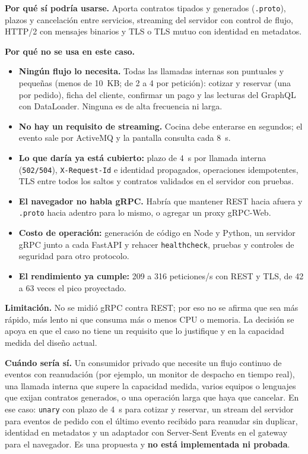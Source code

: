 \textbf{Por qué sí podría usarse.} Aporta contratos tipados y generados (\texttt{.\allowbreak{}proto}), plazos y cancelación entre servicios, streaming del servidor con control de flujo, HTTP/2 con mensajes binarios y TLS o TLS mutuo con identidad en metadatos.


\textbf{Por qué no se usa en este caso.}


\begin{itemize}[nosep,leftmargin=*]
\item \textbf{Ningún flujo lo necesita.} Todas las llamadas internas son puntuales y pequeñas (menos de 10~KB; de 2 a 4 por petición): cotizar y reservar (una por pedido), ficha del cliente, confirmar un pago y las lecturas del GraphQL con DataLoader. Ninguna es de alta frecuencia ni larga.
\item \textbf{No hay un requisito de streaming.} Cocina debe enterarse en segundos; el evento sale por ActiveMQ y la pantalla consulta cada 8~s.
\item \textbf{Lo que daría ya está cubierto:} plazo de 4~s por llamada interna (\texttt{502/\allowbreak{}504}), \texttt{X-\allowbreak{}Request-\allowbreak{}Id} e identidad propagados, operaciones idempotentes, TLS entre todos los saltos y contratos validados en el servidor con pruebas.
\item \textbf{El navegador no habla gRPC.} Habría que mantener REST hacia afuera y \texttt{.\allowbreak{}proto} hacia adentro para lo mismo, o agregar un proxy gRPC-Web.
\item \textbf{Costo de operación:} generación de código en Node y Python, un servidor gRPC junto a cada FastAPI y rehacer \texttt{healthcheck}, pruebas y controles de seguridad para otro protocolo.
\item \textbf{El rendimiento ya cumple:} 209 a 316 peticiones/s con REST y TLS, de 42 a 63 veces el pico proyectado.
\end{itemize}

\textbf{Limitación.} No se midió gRPC contra REST; por eso no se afirma que sea más rápido, más lento ni que consuma más o menos CPU o memoria. La decisión se apoya en que el caso no tiene un requisito que lo justifique y en la capacidad medida del diseño actual.


\textbf{Cuándo sería sí.} Un consumidor privado que necesite un flujo continuo de eventos con reanudación (por ejemplo, un monitor de despacho en tiempo real), una llamada interna que supere la capacidad medida, varios equipos o lenguajes que exijan contratos generados, o una operación larga que haya que cancelar. En ese caso: \texttt{unary} con plazo de 4~s para cotizar y reservar, un stream del servidor para eventos de pedido con el último evento recibido para reanudar sin duplicar, identidad en metadatos y un adaptador con Server-Sent Events en el gateway para el navegador. Es una propuesta y \textbf{no está implementada ni probada}.


